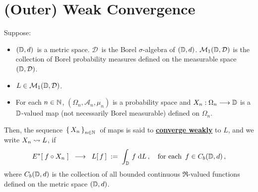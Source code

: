 

\section{(Outer) Weak Convergence}
\setcounter{theorem}{0}
\setcounter{equation}{0}


\renewcommand{\theenumi}{\roman{enumi}}
\renewcommand{\labelenumi}{\textnormal{(\theenumi)}$\;\;$}


\begin{definition}\label{defnOuterWeakConvergence}
\mbox{}
\vskip -0.3cm
\noindent
Suppose:
\begin{itemize}
\item
	$(\mathbb{D},d)$\, is a metric space.
	$\mathcal{D}$\, is the Borel $\sigma$-algebra of $(\mathbb{D},d)$.
	\vskip 0.0cm
	$\mathcal{M}_{1}(\mathbb{D},\mathcal{D})$ is the collection of Borel probability measures
	defined on the measurable space $(\mathbb{D},\mathcal{D})$.
\item
	$L \in \mathcal{M}_{1}(\mathbb{D},\mathcal{D})$.
\item
	For each $n \in \mathbb{N}$,
	$(\Omega_{n},\mathcal{A}_{n},\mu_{n})$ is a probability space and
	$X_{n} : \Omega_{n} \longrightarrow \mathbb{D}$
	is a $\mathbb{D}$-valued map (not necessarily Borel measurable) defined on $\Omega_{n}$.
\end{itemize}
Then, the sequence \,$\left\{\,X_{n}\,\right\}_{n\in\mathbb{N}}$\, of maps is said to
\underline{\textbf{converge weakly}} to $L$, and we write $X_{n} \rightsquigarrow L$, if
\begin{equation*}
E^{*}\!\left[\; f \circ X_{n} \;\right]
\;\; \longrightarrow \;\;
	L\!\left[\,f\,\right] \; := \; \int_{\mathbb{D}}\, f \;\textnormal{d} L\,,
	\quad
	\textnormal{for each \,$f \in C_{b}(\mathbb{D},d)$}\,,
\end{equation*}
where $C_{b}(\mathbb{D},d)$ is the collection of all bounded continuous $\Re$-valued
functions defined on the metric space $(\mathbb{D},d)$.
\end{definition}


